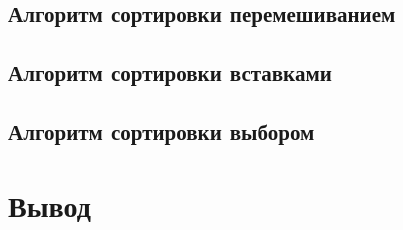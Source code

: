 \subsection{Алгоритм сортировки перемешиванием}


\subsection{Алгоритм сортировки вставками}


\subsection{Алгоритм сортировки выбором}


\section*{Вывод}



